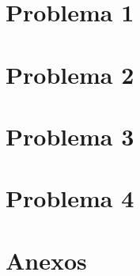 \documentclass[letter, 10pt]{article}
\begin{document}




\section{Problema 1}	

\newpage
\section{Problema 2}

\newpage
\section{Problema 3}

\newpage
\section{Problema 4}

\newpage
\section{Anexos}

\end{document}
